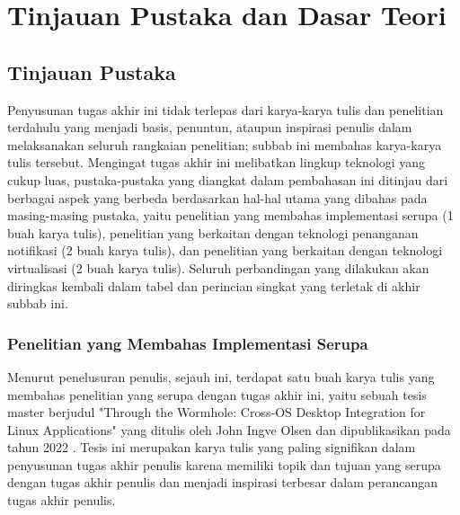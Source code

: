 \chapter{Tinjauan Pustaka dan Dasar Teori}

\section{Tinjauan Pustaka}

Penyusunan tugas akhir ini tidak terlepas dari karya-karya tulis dan penelitian terdahulu yang menjadi basis, penuntun, ataupun inspirasi penulis dalam melaksanakan seluruh rangkaian penelitian; subbab ini membahas karya-karya tulis tersebut. Mengingat tugas akhir ini melibatkan lingkup teknologi yang cukup luas, pustaka-pustaka yang diangkat dalam pembahasan ini ditinjau dari berbagai aspek yang berbeda berdasarkan hal-hal utama yang dibahas pada masing-masing pustaka, yaitu penelitian yang membahas implementasi serupa (1 buah karya tulis), penelitian yang berkaitan dengan teknologi penanganan notifikasi (2 buah karya tulis), dan penelitian yang berkaitan dengan teknologi virtualisasi (2 buah karya tulis). Seluruh perbandingan yang dilakukan akan diringkas kembali dalam tabel dan perincian singkat yang terletak di akhir subbab ini.

\subsection{Penelitian yang Membahas Implementasi Serupa}

Menurut penelusuran penulis, sejauh ini, terdapat satu buah karya tulis yang membahas penelitian yang serupa dengan tugas akhir ini, yaitu sebuah tesis master berjudul "Through the Wormhole: Cross-OS Desktop Integration for Linux Applications" yang ditulis oleh John Ingve Olsen dan dipublikasikan pada tahun 2022 \cite{olsen-2022-through-the-wormhole}. Tesis ini merupakan karya tulis yang paling signifikan dalam penyusunan tugas akhir penulis karena memiliki topik dan tujuan yang serupa dengan tugas akhir penulis dan menjadi inspirasi terbesar dalam perancangan tugas akhir penulis.

